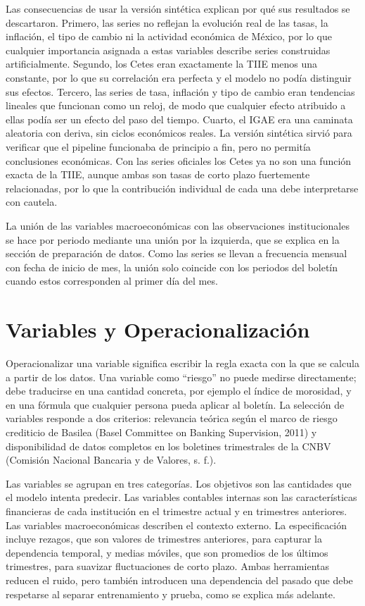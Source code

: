 Las consecuencias de usar la versión sintética explican por qué sus resultados se descartaron. Primero, las series no reflejan la evolución real de las tasas, la inflación, el tipo de cambio ni la actividad económica de México, por lo que cualquier importancia asignada a estas variables describe series construidas artificialmente. Segundo, los Cetes eran exactamente la TIIE menos una constante, por lo que su correlación era perfecta y el modelo no podía distinguir sus efectos. Tercero, las series de tasa, inflación y tipo de cambio eran tendencias lineales que funcionan como un reloj, de modo que cualquier efecto atribuido a ellas podía ser un efecto del paso del tiempo. Cuarto, el IGAE era una caminata aleatoria con deriva, sin ciclos económicos reales. La versión sintética sirvió para verificar que el pipeline funcionaba de principio a fin, pero no permitía conclusiones económicas. Con las series oficiales los Cetes ya no son una función exacta de la TIIE, aunque ambas son tasas de corto plazo fuertemente relacionadas, por lo que la contribución individual de cada una debe interpretarse con cautela.

La unión de las variables macroeconómicas con las observaciones institucionales se hace por periodo mediante una unión por la izquierda, que se explica en la sección de preparación de datos. Como las series se llevan a frecuencia mensual con fecha de inicio de mes, la unión solo coincide con los periodos del boletín cuando estos corresponden al primer día del mes. %

\section{Variables y Operacionalización}

Operacionalizar una variable significa escribir la regla exacta con la que se calcula a partir de los datos. Una variable como ``riesgo'' no puede medirse directamente; debe traducirse en una cantidad concreta, por ejemplo el índice de morosidad, y en una fórmula que cualquier persona pueda aplicar al boletín. La selección de variables responde a dos criterios: relevancia teórica según el marco de riesgo crediticio de Basilea (Basel Committee on Banking Supervision, 2011) y disponibilidad de datos completos en los boletines trimestrales de la CNBV (Comisión Nacional Bancaria y de Valores, s. f.).

Las variables se agrupan en tres categorías. Los objetivos son las cantidades que el modelo intenta predecir. Las variables contables internas son las características financieras de cada institución en el trimestre actual y en trimestres anteriores. Las variables macroeconómicas describen el contexto externo. La especificación incluye rezagos, que son valores de trimestres anteriores, para capturar la dependencia temporal, y medias móviles, que son promedios de los últimos trimestres, para suavizar fluctuaciones de corto plazo. Ambas herramientas reducen el ruido, pero también introducen una dependencia del pasado que debe respetarse al separar entrenamiento y prueba, como se explica más adelante.

